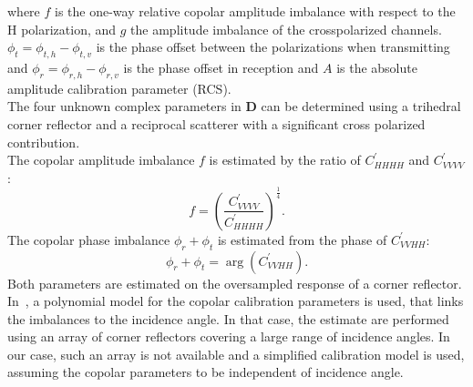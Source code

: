 where $f$ is the one-way relative copolar amplitude imbalance with respect to the H polarization, and $g$ the amplitude imbalance of the crosspolarized channels. $\phi_t = \phi_{t,h} -\phi_{t,v}$ is the phase offset between the polarizations when transmitting and $\phi_{r} = \phi_{r,h} -\phi_{r,v}$ is the phase offset in reception and $A$ is the absolute amplitude calibration parameter (RCS)\cite{Ainsworth2006a, Fore2015}.\\
The four unknown complex parameters in $\mathbf{D}$ can be determined using a trihedral corner reflector and a reciprocal scatterer with a significant cross polarized contribution\cite{Sarabandi1990,Pipia2009}.\\
The  copolar amplitude imbalance $f$ is estimated by the ratio of $C_{HHHH}^\prime$ and $C_{VVVV}^\prime$:
\begin{equation}
	f = \left(\frac{C^{\prime}_{VVVV}}{C^{\prime}_{HHHH}}\right)^{\frac{1}{4}}.
\end{equation}
The copolar phase imbalance $\phi_r + \phi_t$ is estimated from the phase of $C_{VVHH}^{\prime}$:
\begin{equation}
	\phi_r + \phi_t = \operatorname{arg}\left(C_{VVHH}^\prime\right).
\end{equation}
Both parameters are estimated on the oversampled response of a corner reflector. In~\cite{Fore2015}, a polynomial model for the copolar calibration parameters is used, that links the imbalances to the incidence angle. In that case, the estimate are performed using an array of corner reflectors covering a large range of incidence angles. In our case, such an array is not available and a simplified calibration model is used, assuming the copolar parameters to be independent of incidence angle.\\ 
